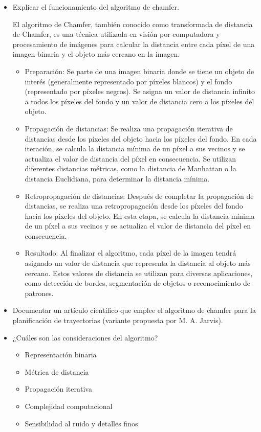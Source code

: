 \documentclass{article}
\begin{document}
\begin{itemize}
\item Explicar el funcionamiento del algoritmo de chamfer.

  El algoritmo de Chamfer, también conocido como transformada de distancia de Chamfer, es una técnica utilizada en visión por computadora y procesamiento de imágenes para calcular la distancia entre cada píxel de una imagen binaria y el objeto más cercano en la imagen.

  \begin{itemize}
  \item Preparación: Se parte de una imagen binaria donde se tiene un objeto de interés (generalmente representado por píxeles blancos) y el fondo (representado por píxeles negros). Se asigna un valor de distancia infinito a todos los píxeles del fondo y un valor de distancia cero a los píxeles del objeto.
  \item Propagación de distancias: Se realiza una propagación iterativa de distancias desde los píxeles del objeto hacia los píxeles del fondo. En cada iteración, se calcula la distancia mínima de un píxel a sus vecinos y se actualiza el valor de distancia del píxel en consecuencia. Se utilizan diferentes distancias métricas, como la distancia de Manhattan o la distancia Euclidiana, para determinar la distancia mínima.
  \item Retropropagación de distancias: Después de completar la propagación de distancias, se realiza una retropropagación desde los píxeles del fondo hacia los píxeles del objeto. En esta etapa, se calcula la distancia mínima de un píxel a sus vecinos y se actualiza el valor de distancia del píxel en consecuencia.
  \item Resultado: Al finalizar el algoritmo, cada píxel de la imagen tendrá asignado un valor de distancia que representa la distancia al objeto más cercano. Estos valores de distancia se utilizan para diversas aplicaciones, como detección de bordes, segmentación de objetos o reconocimiento de patrones.
  \end{itemize}
  
\item Documentar un artículo científico que emplee el algoritmo de chamfer para la planificación de trayectorias (variante propuesta por M. A. Jarvis).

  
  
\item ¿Cuáles son las consideraciones del algoritmo?

  \begin{itemize}
  \item Representación binaria
  \item Métrica de distancia
  \item Propagación iterativa
  \item Complejidad computacional
  \item Sensibilidad al ruido y detalles finos
  \end{itemize}
  

\end{itemize}
\end{document}
